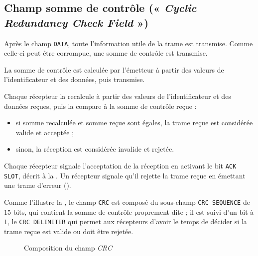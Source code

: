 \subsection{Champ somme de contrôle (« \emph{Cyclic Redundancy Check Field} »)}

Après le champ \texttt{DATA}, toute l'information utile de la trame est transmise. Comme celle-ci peut être corrompue, une somme de contrôle est transmise. 

La somme de contrôle est calculée par l'émetteur à partir des valeurs de l'identificateur et des données, puis transmise.

Chaque récepteur la recalcule à partir des valeurs de l'identificateur et des données reçues, puis la compare à la somme de contrôle reçue :
\begin{itemize}
  \item si somme recalculée et somme reçue sont égales, la trame reçue est considérée valide et acceptée ;
  \item sinon, la réception est considérée invalide et rejetée.
\end{itemize}

Chaque récepteur signale l'acceptation de la réception en activant le bit \texttt{ACK SLOT}, décrit à la . Un récepteur signale qu'il rejette la trame reçue en émettant une trame d'erreur ().

Comme l'illustre la , le champ \texttt{CRC} est composé du sous-champ \texttt{CRC SEQUENCE} de $15$ bits, qui contient la somme de contrôle proprement dite ; il est suivi d'un bit à $1$, le \texttt{CRC DELIMITER} qui permet aux récepteurs d'avoir le temps de décider si la trame reçue est valide ou doit être rejetée.

\begin{figure}[ht]
  \centering
  \caption{Composition du champ \emph{CRC}}
\end{figure}


